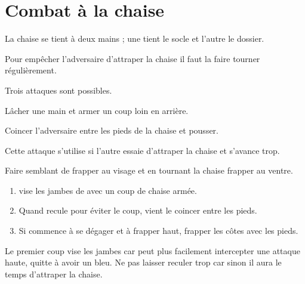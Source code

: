 \section{Combat à la chaise}

La chaise se tient à deux mains ; une tient le socle et l'autre le dossier.

Pour empêcher l'adversaire d'attraper la chaise il faut la faire tourner régulièrement.

Trois attaques sont possibles.

\begin{coup}
\label{coup:close-combat:chaise:frappe-armée}

Lâcher une main et armer un coup loin en arrière.
\end{coup}

\begin{coup}
\label{coup:close-combat:chaise:coincer}

Coincer l'adversaire entre les pieds de la chaise et pousser.

Cette attaque s'utilise si l'autre essaie d'attraper la chaise et s'avance trop.
\end{coup}

\begin{coup}
\label{coup:close-combat:chaise:coup-pied}

Faire semblant de frapper au visage et en tournant la chaise frapper au ventre.
\end{coup}


\begin{technique}

\begin{enumerate}
	\item \A vise les jambes de \D avec un coup de chaise armée.
	
	\item Quand \D recule pour éviter le coup, \A vient le coincer entre les pieds.
	
	\item Si \D commence à se dégager et à frapper haut, frapper les côtes avec les pieds.
\end{enumerate}

Le premier coup vise les jambes car \D peut plus facilement intercepter une attaque haute, quitte à avoir un bleu.
Ne pas laisser \D reculer trop car sinon il aura le temps d'attraper la chaise.

\end{technique}


